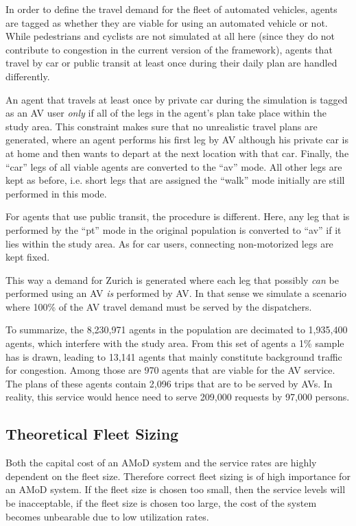 In order to define the travel demand for the fleet of automated vehicles, agents
are tagged as whether they are viable for using an automated vehicle or not.
While pedestrians and cyclists are not simulated at all here (since they do not
contribute to congestion in the current version of the framework), agents that
travel by car or public transit at least once during their daily plan are
handled differently.

An agent that travels at least once by private car during the simulation is tagged
as an AV user \textit{only} if all of the legs in the agent's plan take place
within the study area. This constraint makes sure that no unrealistic travel
plans are generated, where an agent performs his first leg by AV although his
private car is at home and then wants to depart at the next location with that
car. Finally, the ``car'' legs of all viable agents are converted to the ``av'' mode.
All other legs are kept as before, i.e. short legs that are assigned the ``walk''
mode initially are still performed in this mode.

For agents that use public transit, the procedure is different. Here, any leg
that is performed by the ``pt'' mode in the original population is converted to ``av''
if it lies within the study area. As for car users, connecting non-motorized
legs are kept fixed.

This way a demand for Zurich is generated where each leg that possibly
\textit{can} be performed using an AV \textit{is} performed by AV. In that sense we
simulate a scenario where 100\% of the AV travel demand must be served by the
dispatchers.

To summarize, the 8,230,971 agents in the population are decimated to
1,935,400 agents, which interfere with the study area. From this set of agents
a 1\% sample has is drawn, leading to 13,141 agents that mainly constitute
background traffic for congestion. Among those are 970 agents that are viable for the AV
service. The plans of these agents contain 2,096 trips that are to be served by
AVs. In reality, this service would hence need to serve 209,000 requests by
97,000 persons.

\subsection{Theoretical Fleet Sizing}

Both the capital cost of an AMoD system and the service rates are highly dependent on the fleet size. Therefore correct fleet sizing is of high importance for an AMoD system. If the fleet size is chosen too small, then the service levels will be inacceptable, if the fleet size is chosen too large, the cost of the system becomes unbearable due to low utilization rates.

